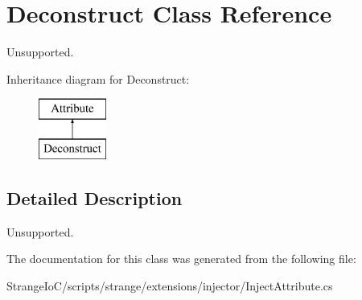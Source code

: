 \hypertarget{class_deconstruct}{\section{Deconstruct Class Reference}
\label{class_deconstruct}
}


Unsupported.  


Inheritance diagram for Deconstruct\-:\begin{figure}[H]
\begin{center}
\leavevmode
\includegraphics[height=2.000000cm]{class_deconstruct}
\end{center}
\end{figure}


\subsection{Detailed Description}
Unsupported. 

The documentation for this class was generated from the following file\-:\begin{DoxyCompactItemize}
\item 
Strange\-Io\-C/scripts/strange/extensions/injector/Inject\-Attribute.\-cs\end{DoxyCompactItemize}
